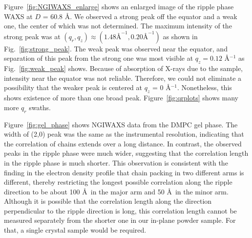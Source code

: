 Figure~\ref{fig:NGIWAXS_enlarge} shows an enlarged image of the ripple 
phase WAXS at $D$ = 60.8 \AA. We observed a strong peak off the 
equator and a weak one, the center of which was not determined. 
The maximum intensity of the strong peak was at 
$(q_r, q_z) \approx (1.48 \text{\AA}^{-1}, 0.20 \text{\AA}^{-1})$ as shown
in Fig.~\ref{fig:strong_peak}. The weak peak was observed near the equator, and
separation of this peak from the strong one was most visible at 
$q_z = 0.12$ \AA$^{-1}$ as Fig.~\ref{fig:weak_peak} shows. Because of absorption
of X-rays due to the sample, intensity near the equator was not reliable.
Therefore, we could not eliminate a possibility that the weaker peak
is centered at $q_z$ = 0 \AA$^{-1}$. Nonetheless, this shows existence 
of more than one broad peak. Figure~\ref{fig:qrplots} shows many more
$q_r$ swaths.

Figure~\ref{fig:gel_phase} shows NGIWAXS data from the DMPC gel phase.
The width of (2,0) peak was the same as the instrumental resolution, 
indicating that the correlation of chains extends over a long distance.
In contrast, the observed peaks in the ripple phase were much wider,
suggesting that the correlation length in the ripple phase is much shorter.
This observation is consistent with the finding in the electron density profile
that chain packing in two different arms is different, thereby restricting 
the longest possible correlation along the ripple direction to be about 
100 \AA\ in the major arm and 50 \AA\ in the minor arm. Although
it is possible that the correlation length along the direction perpendicular
to the ripple direction is long, this correlation length cannot be measured
separately from the shorter one in our in-plane powder sample. For that,
a single crystal sample would be required.

